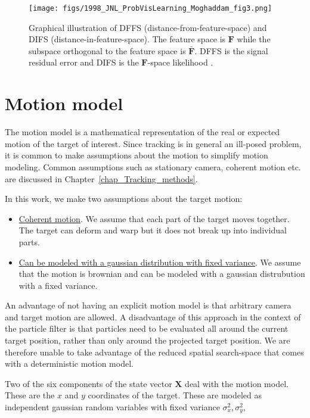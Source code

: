 								\begin{figure}[t]
								\centering
								\texttt{[image: figs/1998\_JNL\_ProbVisLearning\_Moghaddam\_fig3.png]}
								\caption{Graphical illustration of DFFS (distance-from-feature-space) and DIFS (distance-in-feature-space).  The feature space is $\mathbf{F}$ while the subspace orthogonal to the feature space is $\bar{\mathbf{F}}$.  DFFS is the signal residual error and DIFS is the $\mathbf{F}$-space likelihood \cite{1997_JNL_EigenTRK_Moghaddam}.}
								\label{fig:1997_JNL_DIFSDFFS_Moghaddam}
								\end{figure}





\section{Motion model}
The motion model is a mathematical representation of the real or expected motion of the target of interest.  Since tracking is in general an ill-posed problem, it is common to make assumptions about the motion to simplify motion modeling.  Common assumptions such as stationary camera, coherent motion etc. are discussed in Chapter~\ref{chap_Tracking_methods}.

In this work, we make two assumptions about the target motion:

\begin{itemize}
\item \underline{Coherent motion}.  We assume that each part of the target moves together.  The target can deform and warp but it does not break up into individual parts.
\item \underline{Can be modeled with a gaussian distribution with fixed variance}.  We assume that the motion is brownian and can be modeled with a gaussian distrubution with a fixed variance.  
\end{itemize}

An advantage of not having an explicit motion model is that arbitrary camera and target motion are allowed.  A disadvantage of this approach in the context of the particle filter is that particles need to be evaluated all around the current target position, rather than only around the projected target position.  We are therefore unable to take advantage of the reduced spatial search-space that comes with a deterministic motion model.  

Two of the six components of the state vector $\mathbf{X}$ deal with the motion model.  These are the $x$ and $y$ coordinates of the target.  These are modeled as independent gaussian random variables with fixed variance $\sigma_x^2, \sigma_y^2$,

